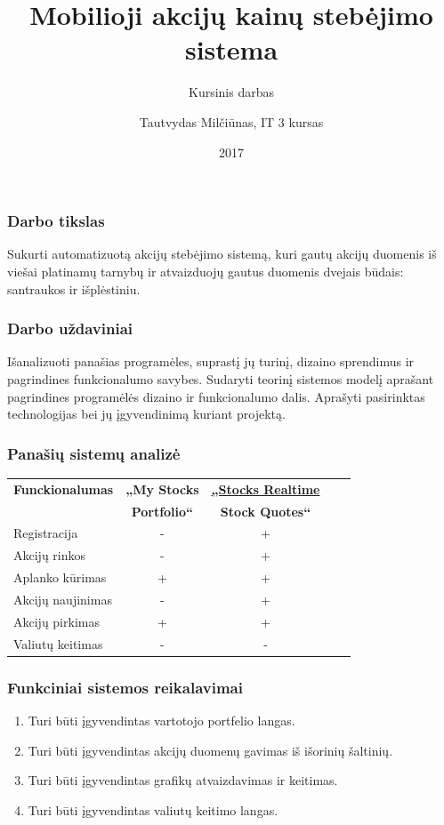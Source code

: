 \documentclass[hyperref={breaklinks=true},fleqn,mathserif]{beamer}
\title[Mobilioji akcijų kainų stebėjimo sistema]{Mobilioji akcijų kainų stebėjimo sistema}
\subtitle{Kursinis darbas}
\author{Tautvydas Milčiūnas, IT 3 kursas}
\institute{Vilniaus Universitetas, Lietuva \\
	\smallskip Matematikos ir informatikos fakultetas \\
	\smallskip Kompiuterijos katedra
}
\date{{\scriptsize 2017}}
\begin{document}
	\frame[plain]{\titlepage}
	
	\begin{frame}
		\frametitle{Darbo tikslas}
		Sukurti automatizuotą akcijų stebėjimo sistemą, kuri gautų akcijų duomenis iš viešai platinamų tarnybų ir atvaizduojų gautus duomenis dvejais būdais: santraukos ir išplėstiniu.
	\end{frame}
	\begin{frame}
		\frametitle{Darbo uždaviniai}
		Išanalizuoti panašias programėles, suprastį jų turinį, dizaino sprendimus ir pagrindines funkcionalumo savybes. Sudaryti teorinį sistemos modelį aprašant pagrindines programėlės dizaino ir funkcionalumo dalis. Aprašyti pasirinktas technologijas bei jų įgyvendinimą kuriant projektą.
	\end{frame}
	\begin{frame}
		\frametitle{Panašių sistemų analizė}
		\begin{table}\centering
			\begin{tabular}{|l|c|c|ll}
				\cline{1-3}
				\textbf{Funckionalumas} & \textbf{„My Stocks} & \textbf{\href{https://play.google.com/store/apps/details?id=org.dayup.stocks}{„Stocks Realtime}} &  \\
				& \textbf{ Portfolio“}&\textbf{Stock Quotes“}  \\ \cline{1-3}
				Registracija&-&+& \\ \cline{1-3}
				Akcijų rinkos&-&+& \\ \cline{1-3}
				Aplanko kūrimas&+&+& \\ \cline{1-3}
				Akcijų naujinimas&-&+& \\ \cline{1-3}
				Akcijų pirkimas&+&+& \\ \cline{1-3}
				Valiutų keitimas&-&-& \\ \cline{1-3}
			\end{tabular}
		\end{table}
	\end{frame}
	\begin{frame}
		\frametitle{Funkciniai sistemos reikalavimai}
		\begin{enumerate}
			\item Turi būti įgyvendintas vartotojo portfelio langas.
			\item Turi būti įgyvendintas akcijų duomenų gavimas iš išorinių šaltinių.
			\item Turi būti įgyvendintas grafikų atvaizdavimas ir keitimas.
			\item Turi būti įgyvendintas valiutų keitimo langas.
		\end{enumerate}
	\end{frame}
\end{document}

